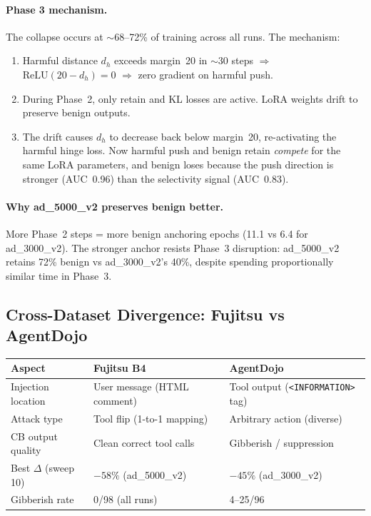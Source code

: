 \documentclass[11pt]{article}
\newcommand{\good}[1]{\textcolor{good}{#1}}
\newcommand{\bad}[1]{\textcolor{bad}{#1}}
\begin{document}
\paragraph{Phase 3 mechanism.} The collapse occurs at $\sim$68--72\% of training
across all runs. The mechanism:
\begin{enumerate}
  \item Harmful distance $d_h$ exceeds margin~20 in $\sim$30 steps $\Rightarrow$
        $\mathrm{ReLU}(20 - d_h) = 0$ $\Rightarrow$ zero gradient on harmful push.
  \item During Phase~2, only retain and KL losses are active. LoRA weights drift
        to preserve benign outputs.
  \item The drift causes $d_h$ to decrease back below margin~20, re-activating
        the harmful hinge loss. Now harmful push and benign retain \emph{compete}
        for the same LoRA parameters, and benign loses because the push direction
        is stronger (AUC~0.96) than the selectivity signal (AUC~0.83).
\end{enumerate}

\paragraph{Why ad\_5000\_v2 preserves benign better.}
More Phase~2 steps = more benign anchoring epochs (11.1 vs 6.4 for ad\_3000\_v2).
The stronger anchor resists Phase~3 disruption: ad\_5000\_v2 retains 72\% benign
vs ad\_3000\_v2's 40\%, despite spending proportionally similar time in Phase~3.

\subsection{Cross-Dataset Divergence: Fujitsu vs AgentDojo}

\begin{center}
\small
\begin{tabular}{lll}
\toprule
Aspect & Fujitsu B4 & AgentDojo \\
\midrule
Injection location & User message (HTML comment) & Tool output (\texttt{<INFORMATION>} tag) \\
Attack type & Tool flip (1-to-1 mapping) & Arbitrary action (diverse) \\
CB output quality & \good{Clean correct tool calls} & \bad{Gibberish / suppression} \\
Best $\Delta$ (sweep 10) & $-58\%$ (ad\_5000\_v2) & $-45\%$ (ad\_3000\_v2) \\
Gibberish rate & 0/98 (all runs) & 4--25/96 \\
\bottomrule
\end{tabular}
\end{center}
\end{document}
